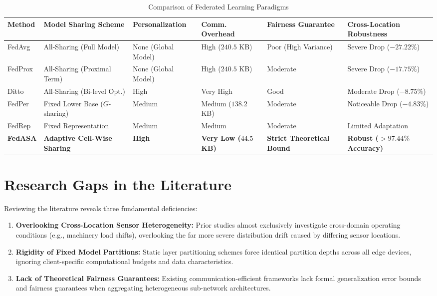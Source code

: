 \documentclass[12pt,a4paper]{report}
\begin{document}
\begin{table}[htbp]
\centering
\caption{Comparison of Federated Learning Paradigms}
\label{tab:lit_comparison}
\vspace{0.3cm}
\renewcommand{\arraystretch}{1.45}
\setlength{\tabcolsep}{4pt}
{\fontsize{10.5}{14}\selectfont
\begin{tabularx}{\textwidth}{|l|>{\centering\arraybackslash}p{2.6cm}|>{\centering\arraybackslash}p{2.5cm}|>{\centering\arraybackslash}p{1.9cm}|>{\centering\arraybackslash}p{2.1cm}|>{\centering\arraybackslash}X|}
\hline
\textbf{Method} & \textbf{Model Sharing Scheme} & \textbf{Personalization} & \textbf{Comm. Overhead} & \textbf{Fairness Guarantee} & \textbf{Cross-Location Robustness} \\
\hline
FedAvg \cite{ref_mcmahan_fedavg} & All-Sharing (Full Model) & None (Global Model) & High ($240.5$ KB) & Poor (High Variance) & Severe Drop ($-27.22\%$) \\
FedProx \cite{ref_li_fedprox} & All-Sharing (Proximal Term) & None (Global Model) & High ($240.5$ KB) & Moderate & Severe Drop ($-17.75\%$) \\
Ditto \cite{ref_li_ditto} & All-Sharing (Bi-level Opt.) & High & Very High & Good & Moderate Drop ($-8.75\%$) \\
FedPer \cite{ref_arivazhagan_fedper} & Fixed Lower Base ($G$-sharing) & Medium & Medium ($138.2$ KB) & Moderate & Noticeable Drop ($-4.83\%$) \\
FedRep \cite{ref_collins_fedrep} & Fixed Representation & Medium & Medium & Moderate & Limited Adaptation \\
\textbf{FedASA} & \textbf{Adaptive Cell-Wise Sharing} & \textbf{High} & \textbf{Very Low ($44.5$ KB)} & \textbf{Strict Theoretical Bound} & \textbf{Robust ($>97.44\%$ Accuracy)} \\
\hline
\end{tabularx}
}
\end{table}

\section{Research Gaps in the Literature}
Reviewing the literature reveals three fundamental deficiencies:
\begin{enumerate}
    \item \textbf{Overlooking Cross-Location Sensor Heterogeneity:} Prior studies almost exclusively investigate cross-domain operating conditions (e.g., machinery load shifts), overlooking the far more severe distribution drift caused by differing sensor locations.
    \item \textbf{Rigidity of Fixed Model Partitions:} Static layer partitioning schemes force identical partition depths across all edge devices, ignoring client-specific computational budgets and data characteristics.
    \item \textbf{Lack of Theoretical Fairness Guarantees:} Existing communication-efficient frameworks lack formal generalization error bounds and fairness guarantees when aggregating heterogeneous sub-network architectures.
\end{enumerate}
\end{document}
